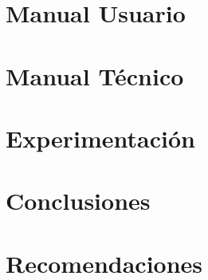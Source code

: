 \documentclass{article}
\begin{document}
\section{Manual Usuario}\label{sec:man_u}



\section{Manual Técnico}




\section{Experimentación}\label{sec:exp}




\section{Conclusiones}\label{sec:concl}



\section{Recomendaciones}\label{secrecomen}
\end{document}
